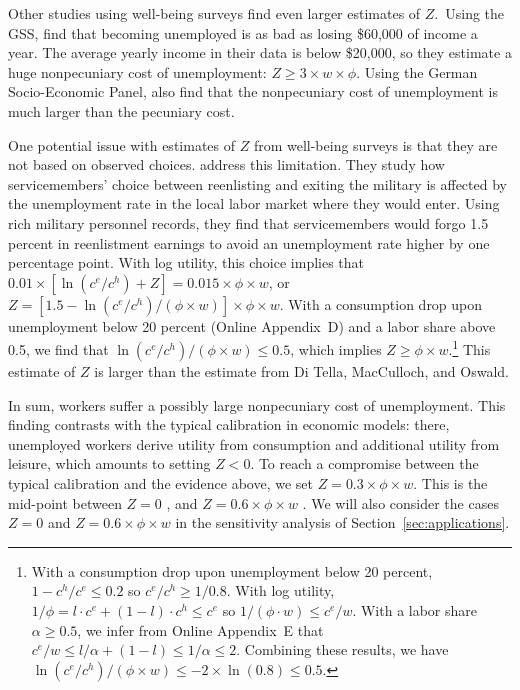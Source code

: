 \documentclass[letterpaper,12pt,leqno]{article}
\newcommand{\brk}[1]{\left[ #1 \right]}
\def \a{{\alpha}}
\def \f{{\phi}}
\begin{document}
Other studies using well-being surveys find even larger estimates of $Z$.\ Using the GSS, \citet[p.~1373, p.~1382]{BO04} find that becoming unemployed is as bad as losing \$60,000 of income a year. The average yearly income in their data is below \$20,000, so they estimate a huge nonpecuniary cost of unemployment: $Z\geq 3 \times w \times \f$. Using the German Socio-Economic Panel, \citet{WW98} also find that the nonpecuniary cost of unemployment is much larger than the pecuniary cost. 

One potential issue with estimates of $Z$ from well-being surveys is that they are not based on observed choices. \citet{BM15} address this limitation. They study how servicemembers' choice between reenlisting and exiting the military is affected by the unemployment rate in the local labor market where they would enter. Using rich military personnel records, they find that servicemembers would forgo 1.5 percent in reenlistment earnings to avoid an unemployment rate higher by one percentage point. With log utility, this choice implies that $0.01 \times \brk{\ln(c^e/c^h)+Z}=0.015\times \f\times w$, or $Z =\brk{1.5-\ln(c^e/c^h)/(\f\times w)}\times \f\times w$. With a consumption drop upon unemployment below 20 percent (Online Appendix~D) and a labor share above 0.5, we find that $\ln(c^e/c^h)/(\f\times w)\leq 0.5$, which implies $Z\geq \f\times w$.\footnote{With a consumption drop upon unemployment below 20 percent, $1-c^h/c^e\leq 0.2$ so $c^e/c^h\geq 1/0.8$. With log utility, $1/\f=l \cdot c^e + (1-l)\cdot c^h\leq c^e$ so $1/(\f \cdot w)\leq c^e/w$. With a labor share $\a\geq 0.5$, we infer from Online Appendix~E that $c^e/w\leq l/\a + (1-l)\leq 1/\a \leq 2$. Combining these results, we have  $\ln(c^e/c^h)/(\f\times w)\leq - 2\times \ln(0.8) \leq 0.5$.} This estimate of $Z$ is larger than the estimate from Di Tella, MacCulloch, and Oswald.

In sum, workers suffer a possibly large nonpecuniary cost of unemployment. This finding contrasts with the typical calibration in economic models: there, unemployed workers derive utility from consumption and additional utility from leisure, which amounts to setting $Z<0$. To reach a compromise between the typical calibration and the evidence above, we set $Z=0.3 \times \f\times w$. This is the mid-point between $Z=0$ \citep[as in][]{S05}, and $Z=0.6 \times \f\times w$ \citep[as in][]{TMO03}. We will also consider the cases $Z=0$ and $Z=0.6\times \f\times w $ in the sensitivity analysis of Section~\ref{sec:applications}.
\end{document}
